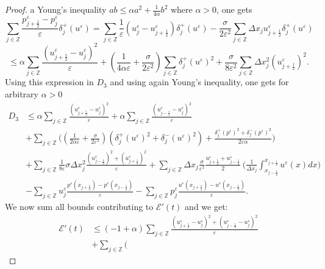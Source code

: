 \documentclass[a4paper,french,english,10pt]{article}
\newcommand\eps{\varepsilon}
\begin{document}
\begin{proof}
 a Young's inequality 
$ab\leq \alpha a^2+\frac1{4\alpha }b^2$ where $\alpha>0$, one gets 
$$
\underset{j\in \mathbb{Z}}{\sum}
\frac{p_{j+\frac12 }^{\eps}-p_{j}^{\eps}}{\eps}
\delta_{j }^+\left( u^{\eps}\right) 
= \sum_{j\in \mathbb{Z}} \frac{1}{\eps} (
u^{\eps}_j-u_{j+\frac12 }^{\eps})\delta_{j }^+\left( u^{\eps}\right) 
 -\frac{\sigma}{2\eps^2}
\sum_{j\in \mathbb{Z}}\Delta x_j 
u_{j+\frac12 }^{\eps}
\delta_{j }^+\left( u^{\eps}\right) 
$$
$$
\leq \alpha \sum_{j\in \mathbb{Z}}
\frac{(u_{j+\frac12 }^{\eps}-u_j^{\eps})^2}{\eps}
+
\left( \frac{1}{4\alpha\eps}+
\frac{\sigma}{2\eps^2}
\right)
\sum_{j\in \mathbb{Z}}
\delta_{j}^+\left(u^{\eps}\right)^2+
\frac\sigma{8\eps^2}
\sum_{j\in \mathbb{Z}}
\Delta x_j^2 \left( u_{j+\frac12 }^{\eps}\right)^2.
$$
Using this expression in $D_3$ and  using again Young's inequality, one gets for 
arbitrary  $\alpha>0$
\begin{equation*}
\begin{aligned}
 D_3 &\leq \alpha \sum_{j\in \mathbb{Z}}
\frac{(u_{j+\frac12 }^{\eps}-u_j^{\eps})^2}{\eps} + \alpha \sum_{j\in
\mathbb{Z}} \frac{(u_{j-\frac12 }^{\eps}-u_j^{\eps})^2}{\eps} \\
&+\sum_{j\in \mathbb{Z}} \bigg(
\left( \frac{1}{2\alpha\eps}+\frac{\sigma}{2\eps^2}\right)
\left( 
\delta_{j}^+\left(u^{\eps}\right)^2+
\delta_{j}^-\left(u^{\eps}\right)^2
\right)
+\frac{\delta_{j}^+\left(p^{\eps}\right)^2
+\delta_{j}^-\left(p^{\eps}\right)^2
}{2\eps\alpha} \bigg) \\
&+ \sum_{j\in \mathbb{Z}} \frac{1}{8\eps} \sigma \Delta x_j^2
\frac{(u_{j-\frac12 }^{\eps})^2 + (u_{j+\frac12 }^{\eps})^2}{\eps}+
\sum_{j\in \mathbb{Z}} \Delta x_j  \frac{\sigma}{\eps^2}
\frac{u_{j+\frac12 }^{\eps}+u_{j-\frac12 }^{\eps}}{2}\: \bigg(
\frac{1}{\Delta x_j} {\int_{x_{j-\frac12}}^{x_{j+\frac12}}}u^{\eps}(x) dx \bigg) \\
&- \sum_{j\in \mathbb{Z}} u^{\eps}_j 
\frac{p^{\eps}(x_{j+\frac12 })-p^{\eps}(x_{j-\frac12 })}{\eps} -
\sum_{j\in \mathbb{Z}} p^{\eps}_j
\frac{u^{\eps}(x_{j+\frac12 })-u^{\eps}(x_{j-\frac12 })}{\eps}.
\end{aligned}
\end{equation*}
We now sum  all  bounds contributing to $\mathscr{E}'(t)$ and we get:
\begin{equation*}
\begin{aligned}
\mathscr{E}'(t)  & \leq (-1+\alpha) \sum_{j\in \mathbb{Z}}
\frac{(u_{j+\frac12 }^{\eps}-u_j^{\eps})^2+(u_{j-\frac12 }^{\eps}-u_j^{
\eps})^2}{\eps} \\
&+\sum_{j\in \mathbb{Z}} \bigg(

\end{aligned}
\end{equation*}
\end{proof}
\end{document}
